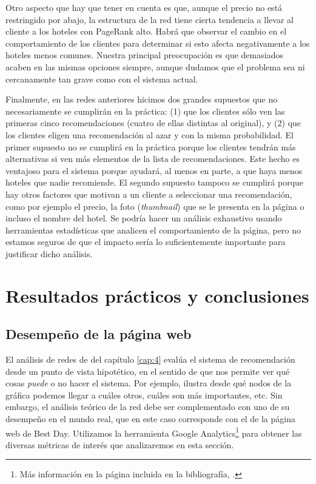 \documentclass[12pt]{report}
\begin{document}
Otro aspecto que hay que tener en cuenta es que, aunque el precio no está restringido por abajo, la estructura de la red tiene cierta tendencia a llevar al cliente a los hoteles con PageRank alto. Habrá que observar el cambio en el comportamiento de los clientes para determinar si esto afecta negativamente a los hoteles menos comunes. Nuestra principal preocupación es que demasiados acaben en las mismas opciones siempre, aunque dudamos que el problema sea ni cercanamente tan grave como con el sistema actual.

Finalmente, en las redes anteriores hicimos dos grandes supuestos que no necesariamente se cumplirán en la práctica: (1) que los clientes sólo ven las primeras cinco recomendaciones (cuatro de ellas distintas al original), y (2) que los clientes eligen una recomendación al azar y con la misma probabilidad. El primer supuesto no se cumplirá en la práctica porque los clientes tendrán más alternativas si ven más elementos de la lista de recomendaciones. Este hecho es ventajoso para el sistema porque ayudará, al menos en parte, a que haya menos hoteles que nadie recomiende. El segundo supuesto tampoco se cumplirá porque hay otros factores que motivan a un cliente a seleccionar una recomendación, como por ejemplo el precio, la foto (\emph{thumbnail}) que se le presenta en la página o incluso el nombre del hotel. Se podría hacer un análisis exhaustivo usando herramientas estadísticas que analicen el comportamiento de la página, pero no estamos seguros de que el impacto sería lo suficientemente importante para justificar dicho análisis.


\chapter{Resultados prácticos y conclusiones} \label{cap:5}

\section{Desempeño de la página web}

El análisis de redes de del capítulo \ref{cap:4} evalúa el sistema de recomendación desde un punto de vista hipotético, en el sentido de que nos permite ver qué cosas \emph{puede} o no hacer el sistema. Por ejemplo, ilustra desde qué nodos de la gráfica podemos llegar a cuáles otros, cuáles son más importantes, etc. Sin embargo, el análisis teórico de la red debe ser complementado con uno de su desempeño en el mundo real, que en este caso corresponde con el de la página web de Best Day. Utilizamos la herramienta Google Analytics\footnote{Más información en la página incluida en la bibliografía, \cite{analytics}.} para obtener las diversas métricas de interés que analizaremos en esta sección.
\end{document}

